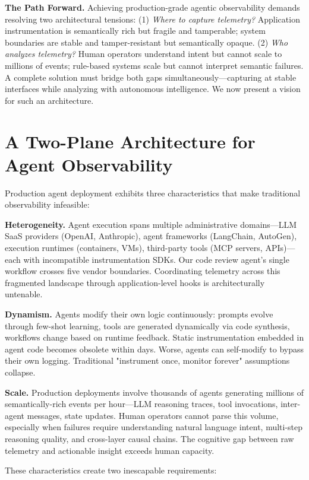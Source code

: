 \documentclass[sigplan,screen,9pt]{acmart}
\begin{document}
\textbf{The Path Forward.} Achieving production-grade agentic observability demands resolving two architectural tensions: (1) \emph{Where to capture telemetry?} Application instrumentation is semantically rich but fragile and tamperable; system boundaries are stable and tamper-resistant but semantically opaque. (2) \emph{Who analyzes telemetry?} Human operators understand intent but cannot scale to millions of events; rule-based systems scale but cannot interpret semantic failures. A complete solution must bridge both gaps simultaneously—capturing at stable interfaces while analyzing with autonomous intelligence. We now present a vision for such an architecture.

\section{A Two-Plane Architecture for Agent Observability}

Production agent deployment exhibits three characteristics that make traditional observability infeasible:

\textbf{Heterogeneity.} Agent execution spans multiple administrative domains—LLM SaaS providers (OpenAI, Anthropic), agent frameworks (LangChain, AutoGen), execution runtimes (containers, VMs), third-party tools (MCP servers, APIs)—each with incompatible instrumentation SDKs. Our code review agent's single workflow crosses five vendor boundaries. Coordinating telemetry across this fragmented landscape through application-level hooks is architecturally untenable.

\textbf{Dynamism.} Agents modify their own logic continuously: prompts evolve through few-shot learning, tools are generated dynamically via code synthesis, workflows change based on runtime feedback. Static instrumentation embedded in agent code becomes obsolete within days. Worse, agents can self-modify to bypass their own logging. Traditional "instrument once, monitor forever" assumptions collapse.

\textbf{Scale.} Production deployments involve thousands of agents generating millions of semantically-rich events per hour—LLM reasoning traces, tool invocations, inter-agent messages, state updates. Human operators cannot parse this volume, especially when failures require understanding natural language intent, multi-step reasoning quality, and cross-layer causal chains. The cognitive gap between raw telemetry and actionable insight exceeds human capacity.

These characteristics create two inescapable requirements:
\end{document}
